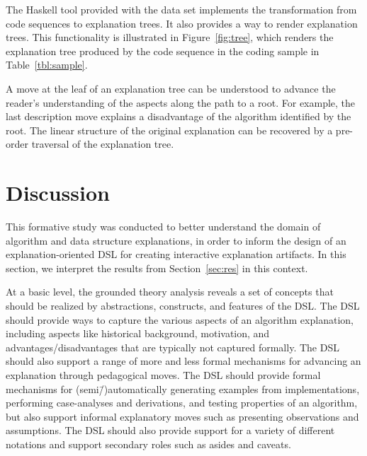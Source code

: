 \documentclass[sigconf]{acmart}
\begin{document}
The Haskell tool provided with the data set implements the transformation from
code sequences to explanation trees. It also provides a way to render
explanation trees. This functionality is illustrated in Figure~\ref{fig:tree},
which renders the explanation tree produced by the code sequence in the coding
sample in Table~\ref{tbl:sample}.


A move at the leaf of an explanation tree can be understood to advance the
reader's understanding of the aspects along the path to a root. For example,
the last description move explains a disadvantage of the algorithm identified
by the root.
%
The linear structure of the original explanation can be recovered by a
pre-order traversal of the explanation tree. 


\section{Discussion}
\label{sec:dis}

This formative study was conducted to better understand the domain of algorithm
and data structure explanations, in order to inform the design of an
explanation-oriented DSL for creating interactive explanation artifacts. In
this section, we interpret the results from Section~\ref{sec:res} in this
context.


At a basic level, the grounded theory analysis reveals a set of concepts that
should be realized by abstractions, constructs, and features of the DSL.
%
The DSL should provide ways to capture the various aspects of an algorithm
explanation, including aspects like historical background, motivation, and
advantages/disadvantages that are typically not captured formally.
%
The DSL should also support a range of more and less formal mechanisms for
advancing an explanation through pedagogical moves. The DSL should provide
formal mechanisms for (semi\=/)automatically generating examples from
implementations, performing case-analyses and derivations, and testing
properties of an algorithm, but also support informal explanatory moves such as
presenting observations and assumptions.
%
The DSL should also provide support for a variety of different notations and
support secondary roles such as asides and caveats.
\end{document}
